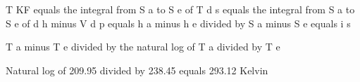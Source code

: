 T KF equals the integral from S a to S e of T d s equals the integral from S a to S e of d h minus V d p equals h a minus h e divided by S a minus S e equals i s

T a minus T e divided by the natural log of T a divided by T e

Natural log of 209.95 divided by 238.45 equals 293.12 Kelvin